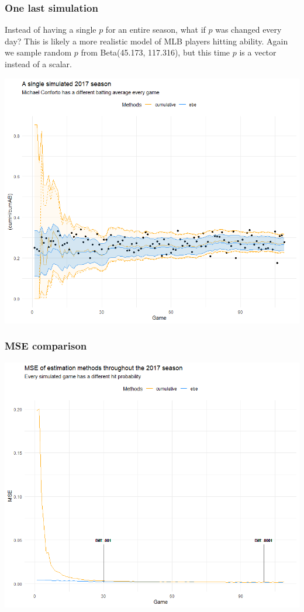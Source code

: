 \documentclass{beamer}
\begin{document}
\begin{frame}
	\frametitle{One last simulation}
	Instead of having a single $p$ for an entire season, what if $p$ was changed every day?
	This is likely a more realistic model of MLB players hitting ability.
	Again we sample random $p$ from Beta(45.173, 117.316), but this time $p$ is a vector instead of a scalar.

	\begin{center}
		\includegraphics[height=.45\linewidth,width=.6\textwidth]{manyp_2017}
	\end{center}
\end{frame}

\begin{frame}
	\frametitle{MSE comparison}
	\begin{center}
		\includegraphics[height=.6\linewidth,width=.7\textwidth]{manyp_mse}
	\end{center}
\end{frame}
\end{document}
